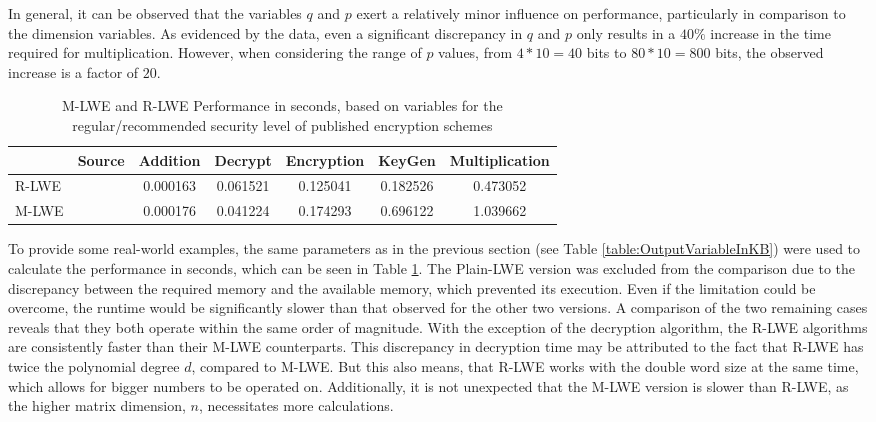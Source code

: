 In general, it can be observed that the variables $q$ and $p$ exert a relatively minor influence on performance, particularly in comparison to the dimension variables. As evidenced by the data, even a significant discrepancy in $q$ and $p$ only results in a $40\%$ increase in the time required for multiplication. However, when considering the range of $p$ values, from $4*10=40$ bits to $80*10=800$ bits, the observed increase is a factor of $20$.


\begin{table}[h]
  \centering
  \caption{M-LWE and R-LWE Performance in seconds, based on variables for the regular/recommended security level of published encryption schemes}
  \begin{tabular}{|l|c||c|c|c|c|c|}
    \toprule
          & Source                      & Addition & Decrypt  & Encryption & KeyGen   & Multiplication \\
    \midrule
    R-LWE & \cite{PracticalKeyExchange} & 0.000163 & 0.061521 & 0.125041   & 0.182526 & 0.473052       \\
    M-LWE & \cite{CyrstalsKyber}        & 0.000176 & 0.041224 & 0.174293   & 0.696122 & 1.039662       \\
    \bottomrule
  \end{tabular}
  \label{table:performanceComparison}
\end{table}

To provide some real-world examples, the same parameters as in the previous section (see Table \ref{table:OutputVariableInKB}) were used to calculate the performance in seconds, which can be seen in Table \ref{table:performanceComparison}. The Plain-LWE version was excluded from the comparison due to the discrepancy between the required memory and the available memory, which prevented its execution. Even if the limitation could be overcome, the runtime would be significantly slower than that observed for the other two versions. A comparison of the two remaining cases reveals that they both operate within the same order of magnitude. With the exception of the decryption algorithm, the R-LWE algorithms are consistently faster than their M-LWE counterparts. This discrepancy in decryption time may be attributed to the fact that R-LWE has twice the polynomial degree $d$, compared to M-LWE. But this also means, that R-LWE works with the double word size at the same time, which allows for bigger numbers to be operated on. Additionally, it is not unexpected that the M-LWE version is slower than R-LWE, as the higher matrix dimension, $n$, necessitates more calculations.

